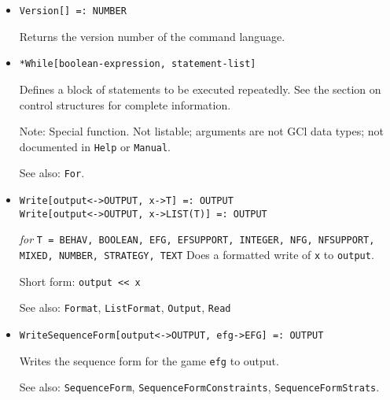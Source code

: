 \begin{itemize}

\item{}
\protect \large \begin{verbatim}
Version[] =: NUMBER 
\end{verbatim} \normalsize

\bd
Returns the version number of the command language.
\ed



\item{} 
\protect \large \begin{verbatim}
*While[boolean-expression, statement-list]
\end{verbatim} \normalsize
  
\bd
Defines a block of statements to be executed repeatedly.
See the section on control structures for complete information.
\item [Note:] Special function.  Not listable; arguments are not GCl
data types; not documented in \verb+Help+ or \verb+Manual+.  
\item
[See also:] \verb+For+.
\ed

\item{}
\protect \large \begin{verbatim}
Write[output<->OUTPUT, x->T] =: OUTPUT  
Write[output<->OUTPUT, x->LIST(T)] =: OUTPUT
\end{verbatim}\normalsize

{\it for} {\tt T = BEHAV, BOOLEAN, EFG, EFSUPPORT, INTEGER,
NFG, NFSUPPORT, MIXED, NUMBER, STRATEGY, TEXT}
\bd
Does a formatted write of \verb+x+ to \verb+output+.
\item [Short form:] \verb+output << x+
\item [See also:] \verb+Format+, \verb+ListFormat+, \verb+Output+, \verb+Read+
\ed

\item{}
\protect \large \begin{verbatim} 
WriteSequenceForm[output<->OUTPUT, efg->EFG] =: OUTPUT
\end{verbatim}\normalsize

\bd 
Writes the sequence form for the game \verb+efg+ to output.  
\item [See also:] \verb+SequenceForm+,
\verb+SequenceFormConstraints+, \verb+SequenceFormStrats+.
\ed




\end{itemize}

